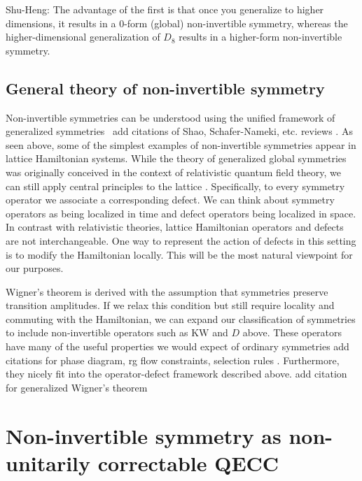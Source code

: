 \documentclass{article}
\theoremstyle{definition}
\begin{document}
  Shu-Heng: The advantage of the first is that once you generalize to higher
  dimensions, it results in a $0$-form (global) non-invertible symmetry, whereas
  the higher-dimensional generalization of $D_{8}$ results in a higher-form non-invertible
  symmetry.

  \color{black}

  \subsection{General theory of non-invertible symmetry}

  Non-invertible symmetries can be understood using the unified framework of
  generalized symmetries~\cite{gaiotto2015generalizedglobalsymmetries}
  \color{brown}
  add citations of Shao, Schafer-Nameki, etc. reviews
  \color{black}
  . As seen above, some of the simplest examples of non-invertible symmetries
  appear in lattice Hamiltonian systems. While the theory of generalized global symmetries
  was originally conceived in the context of relativistic quantum field theory,
  we can still apply central principles to the lattice
  \cite{seiberg2024noninvsymmetriestensorproductspace}. Specifically, to every
  symmetry operator we associate a corresponding defect. We can think about symmetry
  operators as being localized in time and defect operators being localized in space.
  In contrast with relativistic theories, lattice Hamiltonian operators and defects
  are not interchangeable. One way to represent the action of defects in this
  setting is to modify the Hamiltonian locally. This will be the most natural viewpoint
  for our purposes.

  Wigner's theorem is derived with the assumption that symmetries preserve transition
  amplitudes. If we relax this condition but still require locality and
  commuting with the Hamiltonian, we can expand our classification of symmetries
  to include non-invertible operators such as $\textrm{KW}$ and $D$ above. These
  operators have many of the useful properties we would expect of ordinary
  symmetries
  \color{brown}
  add citations for phase diagram, rg flow constraints, selection rules
  \color{black}
  . Furthermore, they nicely fit into the operator-defect framework described above.
  \color{brown}
  add citation for generalized Wigner's theorem
  \color{black}

  \section{Non-invertible symmetry as non-unitarily correctable QECC}
  \label{sec:IntrotoNUCNIS}
\end{document}

